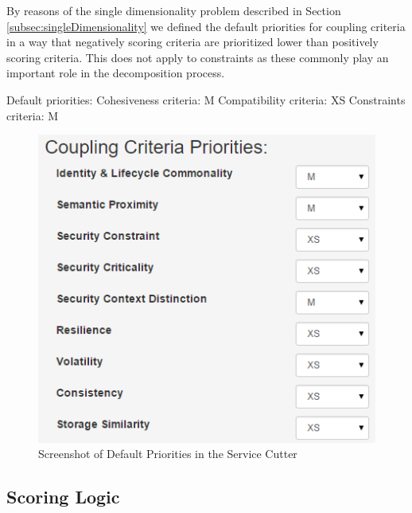 \begin{minipage}[t]{0.5\textwidth}
\setlength{\parskip}{5pt plus 0.1pt}

By reasons of the single dimensionality problem described in Section \ref{subsec:singleDimensionality} we defined the default priorities for coupling criteria in a way that negatively scoring criteria are prioritized lower than positively scoring criteria. This does not apply to constraints as these commonly play an important role in the decomposition process. 

Default priorities: \newline
Cohesiveness criteria: M\newline
Compatibility criteria: XS\newline 
Constraints criteria: M\newline

\end{minipage}
\begin{minipage}[t]{0.6\textwidth}
	\begin{figure}[H]
		\begin{center}
			\includegraphics[scale=0.5]{images/priorities.png}
			\caption{Screenshot of Default Priorities in the Service Cutter}
			\label{fig:priorities}
		\end{center}
	\end{figure}
\end{minipage}

\subsection{Scoring Logic}

